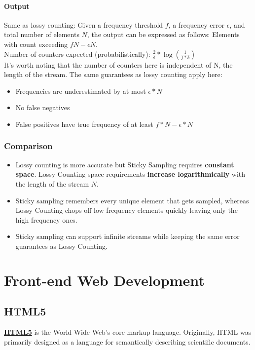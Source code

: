 \documentclass[a4paper, 12pt]{book} %
\begin{document}
\subsection{Output}
Same as lossy counting: Given a frequency threshold $f$, a frequency error $\epsilon$, and total number of elements $N$, the output can be expressed as follows: Elements with count exceeding $fN - \epsilon N$. \\

Number of counters expected (probabilistically): $\frac{2}{\epsilon}*\log{(\frac{1}{f*\delta})}$ \\

It's worth noting that the number of counters here is independent of N, the length of the stream. The same guarantees as lossy counting apply here:
\begin{itemize}
	\item Frequencies are underestimated by at most $\epsilon * N$
	\item No false negatives
	\item False positives have true frequency of at least $f*N - \epsilon*N$
\end{itemize}

\section{Comparison}
\begin{itemize}
	\item Lossy counting is more accurate but Sticky Sampling requires \textbf{constant space}. Lossy Counting space requirements \textbf{increase logarithmically} with the length of the stream $N$.
	\item Sticky sampling remembers every unique element that gets sampled, whereas Lossy Counting chops off low frequency elements quickly leaving only the high frequency ones.
	\item Sticky sampling can support infinite streams while keeping the same error guarantees as Lossy Counting.
\end{itemize}



\part{Front-end Web Development}
\chapter{HTML5}
\href{https://www.w3.org/TR/html5/introduction.html#a-quick-introduction-to-html}{\textbf{HTML5}} is the World Wide Web's core markup language. Originally, HTML was primarily designed as a language for semantically describing scientific documents.







\end{document}
